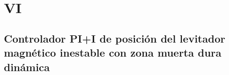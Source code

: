 \chapter{VI}
\section{Controlador PI+I de posición del levitador magnético inestable con zona muerta dura dinámica}


